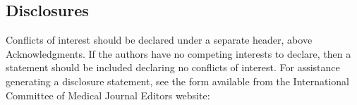 \documentclass[12pt]{spieman}  %
\begin{document}
\begin{spacing}{2}





\subsection{Disclosures}
Conflicts of interest should be declared under a separate header, above
Acknowledgments. If the authors have no competing interests to declare, then a
statement should be included declaring no conflicts of interest. For assistance
generating a disclosure statement, see the form available from  the
International Committee of Medical Journal Editors website:


\end{spacing}
\end{document}
